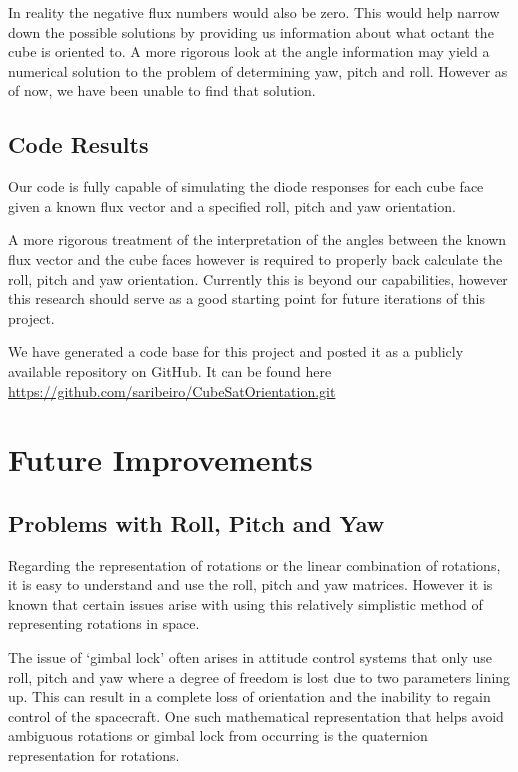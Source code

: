 \documentclass[10pt, letterpaper]{article}
\begin{document}
In reality the negative flux numbers would also be zero. This would help narrow down the possible solutions by providing us information about what octant the cube is oriented to. A more rigorous look at the angle information may yield a numerical solution to the problem of determining yaw, pitch and roll. However as of now, we have been unable to find that solution.

\subsection{Code Results}

Our code is fully capable of simulating the diode responses for each cube face given a known flux vector and a specified roll, pitch and yaw orientation.

A more rigorous treatment of the interpretation of the angles between the known flux vector and the cube faces however is required to properly back calculate the roll, pitch and yaw orientation. Currently this is beyond our capabilities, however this research should serve as a good starting point for future iterations of this project.

We have generated a code base for this project and posted it as a publicly available repository on GitHub. It can be found here \url{https://github.com/saribeiro/CubeSatOrientation.git}

\section{Future Improvements}

\subsection{Problems with Roll, Pitch and Yaw}

Regarding the representation of rotations or the linear combination of rotations, it is easy to understand and use the roll, pitch and yaw matrices. However it is known that certain issues arise with using this relatively simplistic method of representing rotations in space.

The issue of `gimbal lock' often arises in attitude control systems that only use roll, pitch and yaw where a degree of freedom is lost due to two parameters lining up. This can result in a complete loss of orientation and the inability to regain control of the spacecraft. One such mathematical representation that helps avoid ambiguous rotations or gimbal lock from occurring is the quaternion representation for rotations.
\end{document}
